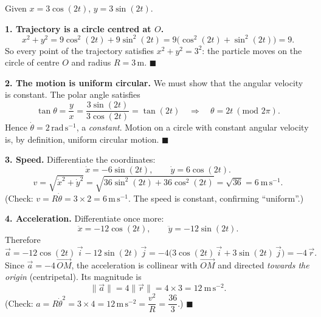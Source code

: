 \documentclass[11pt]{article}
\newcommand{\cle}[1]{{\popxbold\color{popdark}#1}}
\begin{document}
\begin{corrige}
Given $x = 3\cos(2t)$, $y = 3\sin(2t)$.

\textbf{1. Trajectory is a circle centred at $O$.}
\[ x^2 + y^2 = 9\cos^2(2t) + 9\sin^2(2t) = 9\bigl(\cos^2(2t)+\sin^2(2t)\bigr) = 9. \]
So every point of the trajectory satisfies $x^2+y^2 = 3^2$: the particle moves on the \cle{circle} of centre $O$ and radius $R = 3\,\mathrm{m}$. $\blacksquare$

\textbf{2. The motion is uniform circular.} We must show that the angular velocity is constant. The polar angle satisfies
\[ \tan\theta = \frac{y}{x} = \frac{3\sin(2t)}{3\cos(2t)} = \tan(2t) \quad\Longrightarrow\quad \theta = 2t \ (\text{mod } 2\pi). \]
Hence $\dot{\theta} = 2\,\mathrm{rad\,s^{-1}}$, a \emph{constant}. Motion on a circle with constant angular velocity is, by definition, \cle{uniform circular motion}. $\blacksquare$

\textbf{3. Speed.} Differentiate the coordinates:
\[ \dot{x} = -6\sin(2t), \qquad \dot{y} = 6\cos(2t). \]
\[ v = \sqrt{\dot{x}^2 + \dot{y}^2} = \sqrt{36\sin^2(2t) + 36\cos^2(2t)} = \sqrt{36} = 6\ \mathrm{m\,s^{-1}}. \]
(Check: $v = R\dot{\theta} = 3 \times 2 = 6\,\mathrm{m\,s^{-1}}$. The speed is constant, confirming ``uniform''.)

\textbf{4. Acceleration.} Differentiate once more:
\[ \ddot{x} = -12\cos(2t), \qquad \ddot{y} = -12\sin(2t). \]
Therefore
\[ \vec{a} = -12\cos(2t)\,\vec{i} - 12\sin(2t)\,\vec{j} = -4\bigl(3\cos(2t)\,\vec{i} + 3\sin(2t)\,\vec{j}\bigr) = -4\,\vec{r}. \]
Since $\vec{a} = -4\,\overrightarrow{OM}$, the acceleration is collinear with $\overrightarrow{OM}$ and directed \emph{towards the origin} (centripetal). Its magnitude is
\[ \|\vec{a}\| = 4\|\vec{r}\| = 4 \times 3 = 12\ \mathrm{m\,s^{-2}}. \]
(Check: $a = R\dot{\theta}^2 = 3 \times 4 = 12\,\mathrm{m\,s^{-2}} = \dfrac{v^2}{R} = \dfrac{36}{3}$.) $\blacksquare$
\end{corrige}
\end{document}
